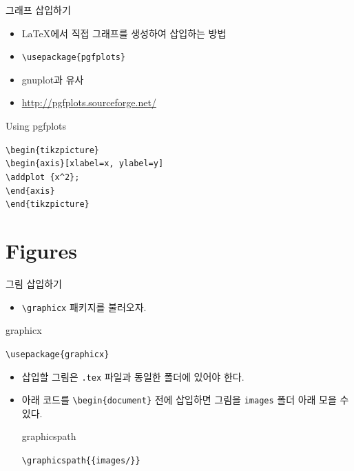 \documentclass[12pt]{gshs_lecture}
\newcommand{\tb}{\textbackslash}
\newenvironment{codeblock}[1]{
	\begin{block}{#1}
		\setstretch{1.0}
		\begin{small}
}{
		\end{small}
	\end{block}
}
\begin{document}
\begin{frame}[t]{그래프 삽입하기}
	\begin{itemize}
		\item \LaTeX 에서 직접 그래프를 생성하여 삽입하는 방법
		\item \texttt{\tb usepackage\{pgfplots\}}
		\item gnuplot과 유사
		\item \url{http://pgfplots.sourceforge.net/}
	\end{itemize}
	
	\begin{codeblock}{Using pgfplots}
		\texttt{\tb begin\{tikzpicture\}\\
			\hspace{6mm} \tb begin\{axis\}[xlabel=x, ylabel=y]\\
			\hspace{6mm} \tb addplot \{x\textasciicircum 2\};\\
			\hspace{6mm} \tb end\{axis\}\\
			\tb end\{tikzpicture\}}
	\end{codeblock}
	
\end{frame}

\section{Figures}

\begin{frame}[t]{그림 삽입하기}
	\begin{itemize}
		\item \texttt{\tb graphicx} 패키지를 불러오자.
	\end{itemize}
	\begin{codeblock}{graphicx}
		\texttt{\tb usepackage\{graphicx\}}
	\end{codeblock}
	\begin{itemize}
		\item 삽입할 그림은 \texttt{.tex} 파일과 동일한 폴더에 있어야 한다.
		\item 아래 코드를 \texttt{\tb begin\{document\}} 전에 삽입하면 그림을 \texttt{images} 폴더 아래 모을 수 있다.
		
		\begin{codeblock}{graphicspath}
			\texttt{\tb graphicspath\{\{images/\}\}}
		\end{codeblock}
	\end{itemize}
\end{frame}
\end{document}
